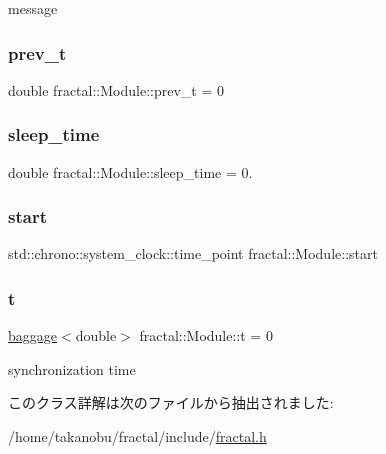 message 

\mbox{\label{classfractal_1_1Module_a47a4704bcfc9255a2e2ee8c81676a9f8}} 
\subsubsection{\texorpdfstring{prev\+\_\+t}{prev\_t}}
{\footnotesize\ttfamily double fractal\+::\+Module\+::prev\+\_\+t = 0\hspace{0.3cm}{\ttfamily [private]}}

\mbox{\label{classfractal_1_1Module_a8f01c07a782ebc8bbdab28212e275979}} 
\subsubsection{\texorpdfstring{sleep\+\_\+time}{sleep\_time}}
{\footnotesize\ttfamily double fractal\+::\+Module\+::sleep\+\_\+time = 0.\hspace{0.3cm}{\ttfamily [private]}}

\mbox{\label{classfractal_1_1Module_a869fe7b6421f11439ac696867a71d9eb}} 
\subsubsection{\texorpdfstring{start}{start}}
{\footnotesize\ttfamily std\+::chrono\+::system\+\_\+clock\+::time\+\_\+point fractal\+::\+Module\+::start\hspace{0.3cm}{\ttfamily [private]}}

\mbox{\label{classfractal_1_1Module_ac14a8d440a0a4f7a0be952a902c3717e}} 
\subsubsection{\texorpdfstring{t}{t}}
{\footnotesize\ttfamily \hyperlink{classfractal_1_1baggage}{baggage}$<$double$>$ fractal\+::\+Module\+::t = 0}



synchronization time 



このクラス詳解は次のファイルから抽出されました\+:\begin{DoxyCompactItemize}
\item 
/home/takanobu/fractal/include/\hyperlink{fractal_8h}{fractal.\+h}\end{DoxyCompactItemize}
